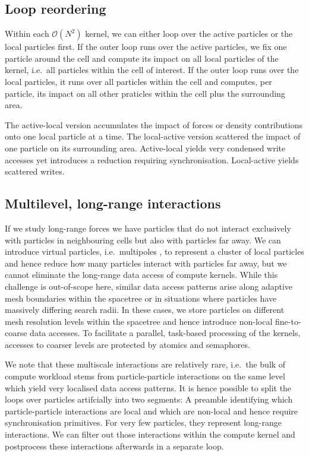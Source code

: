 \subsection{Loop reordering}

Within each $\mathcal{O}(N^2)$ kernel, we can either loop over the active particles or the local particles first.
If the outer loop runs over the active particles, we fix one particle around the cell and compute its impact on all local particles of the kernel, i.e.~all particles within the cell of interest.
If the outer loop runs over the local particles, it runs over all particles within the cell and computes, per particle, its impact on all other praticles within the cell plus the surrounding area.

The active-local version accumulates the impact of forces or density contributions onto one local particle at a time.
The local-active version scattered the impact of one particle on its surrounding area.
Active-local yields very condensed write accesses yet introduces a reduction requiring synchronisation.
Local-active yields scattered writes.


\subsection{Multilevel, long-range interactions}

If we study long-range forces we have particles that do not interact exclusively with particles in neighbouring cells but also with particles far away.
We can introduce virtual particles, i.e.~multipoles \cite{White:1994:FMM}, to represent a cluster of local particles and hence reduce how many particles interact with particles far away, but we cannot eliminate the long-range data access of compute kernels.
While this challenge is out-of-scope here, similar data access patterns arise along adaptive mesh boundaries within the spacetree or in situations where particles have massively differing search radii.
In these cases, we store particles on different mesh resolution levels within the spacetree and hence introduce non-local fine-to-coarse data accesses.
To facilitate a parallel, task-based processing of the kernels, accesses to coarser levels are protected by atomics and semaphores.


We note that these multiscale interactions are relatively rare, i.e.~the bulk of compute workload stems from particle-particle interactions on the same level which yield very localised data access patterns.
It is hence possible to split the loops over particles artifcially into two segments:
A preamble identifying which particle-particle interactions are local and which are non-local and hence require synchronisation primitives.
For very few particles, they represent long-range interactions.
We can filter out those interactions within the compute kernel and postprocess these interactions afterwards in a separate loop.



